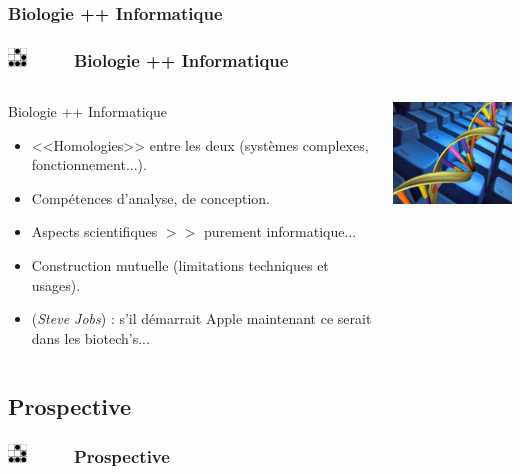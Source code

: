 \documentclass[slidetop,11pt]{beamer}
\def\sectionPartIIIbTR{Biologie ++ Informatique}
\def\sectionPartIIIc{Prospective}
\def\moreInFrameTitle{\includegraphics[height=0.5cm]{img/logo_glider.png}~~~~~}
\begin{document}
\subsubsection{\sectionPartIIIbTR}
\begin{frame}
	\frametitle{\moreInFrameTitle \sectionPartIIIbTR}
	\begin{columns}[c]
	\begin{column}[c]{7cm}
		 \begin{beamerboxesrounded}	[lower=substructureTR, %
		 				 upper=block title TR,%
						 shadow=true]%
		       {\sectionPartIIIbTR}
			\begin{itemize}
				\item<1-> <<Homologies>> entre les deux (syst{\`e}mes complexes, fonctionnement...). 
				\item<2-> Comp{\'e}tences d'analyse, de conception. 
				\item<2-> Aspects scientifiques $ >> $ purement informatique... 
				\item<3-> Construction mutuelle (limitations techniques et usages). 
				\item<4-> (\emph{Steve Jobs}) : s'il d{\'e}marrait Apple maintenant ce serait dans les biotech's... 
			\end{itemize}
		\end{beamerboxesrounded}
	\end{column}
	\begin{column}[c]{4cm}
		\includegraphics[width=4cm]{img/bioinformatique.png}~\\
	\end{column}
	\end{columns}
\end{frame} 

\subsection{\sectionPartIIIc}
\begin{frame}
	\frametitle{\moreInFrameTitle \sectionPartIIIc}
	\tableofcontents[sections=3,subsectionstyle=show/shaded/hide,subsubsectionstyle=show/show/hide]
\end{frame} 
\end{document}
